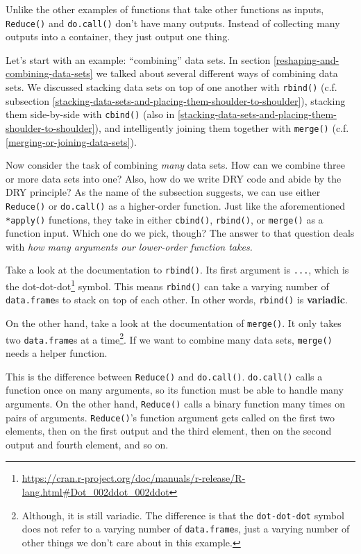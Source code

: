 \documentclass[
  12pt,
  krantz2]{krantz}
\renewcommand{\href}[2]{#2\footnote{\url{#1}}}
\begin{document}
Unlike the other examples of functions that take other functions as inputs, \texttt{Reduce()} and \texttt{do.call()} don't have many outputs. Instead of collecting many outputs into a container, they just output one thing.

Let's start with an example: ``combining'' data sets. In section \ref{reshaping-and-combining-data-sets} we talked about several different ways of combining data sets. We discussed stacking data sets on top of one another with \texttt{rbind()} (c.f. subsection \ref{stacking-data-sets-and-placing-them-shoulder-to-shoulder}), stacking them side-by-side with \texttt{cbind()} (also in \ref{stacking-data-sets-and-placing-them-shoulder-to-shoulder}), and intelligently joining them together with \texttt{merge()} (c.f. \ref{merging-or-joining-data-sets}).

Now consider the task of combining \emph{many} data sets. How can we combine three or more data sets into one? Also, how do we write DRY code and abide by the DRY principle? As the name of the subsection suggests, we can use either \texttt{Reduce()} or \texttt{do.call()} as a higher-order function. Just like the aforementioned \texttt{*apply()} functions, they take in either \texttt{cbind()}, \texttt{rbind()}, or \texttt{merge()} as a function input. Which one do we pick, though? The answer to that question deals with \emph{how many arguments our lower-order function takes.}

Take a look at the documentation to \texttt{rbind()}. Its first argument is \texttt{...}, which is the \href{https://cran.r-project.org/doc/manuals/r-release/R-lang.html\#Dot_002ddot_002ddot}{dot-dot-dot} symbol. This means \texttt{rbind()} can take a varying number of \texttt{data.frame}s to stack on top of each other. In other words, \texttt{rbind()} is \textbf{variadic}.

On the other hand, take a look at the documentation of \texttt{merge()}. It only takes two \texttt{data.frame}s at a time\footnote{Although, it is still variadic. The difference is that the \texttt{dot-dot-dot} symbol does not refer to a varying number of \texttt{data.frame}s, just a varying number of other things we don't care about in this example.}. If we want to combine many data sets, \texttt{merge()} needs a helper function.

This is the difference between \texttt{Reduce()} and \texttt{do.call()}. \texttt{do.call()} calls a function once on many arguments, so its function must be able to handle many arguments. On the other hand, \texttt{Reduce()} calls a binary function many times on pairs of arguments. \texttt{Reduce()}'s function argument gets called on the first two elements, then on the first output and the third element, then on the second output and fourth element, and so on.
\end{document}
